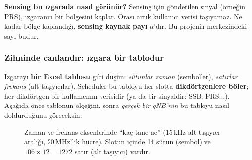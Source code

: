 \textbf{Sensing bu ızgarada nasıl görünür?} Sensing için gönderilen sinyal (örneğin PRS), ızgaranın bir bölgesini kaplar. Orası artık kullanıcı verisi taşıyamaz.
Ne kadar bölge kaplandığı, \textbf{sensing kaynak payı} $\alpha$'dır. Bu projenin merkezindeki sayı budur.

\subsubsection{Zihninde canlandır: ızgara bir tablodur}\label{sec:somut}

Izgarayı \textbf{bir Excel tablosu} gibi düşün: \emph{sütunlar zaman} (semboller), \emph{satırlar frekans} (alt taşıyıcılar). Scheduler bu tabloyu her slotta
\textbf{dikdörtgenlere böler}; her dikdörtgen bir kullanıcının verisidir (ya da bir sinyaldir: SSB, PRS...). Aşağıda önce tablonun ölçeğini, sonra \emph{gerçek bir gNB'nin} bu tabloyu nasıl doldurduğunu göreceksin.

\begin{figure}[H]
\centering
{}
\caption{Zaman ve frekans eksenlerinde ``kaç tane ne'' (15\,kHz alt taşıyıcı aralığı, 20\,MHz'lik hücre). Slotun içinde 14 sütun (sembol) ve $106\times12=1272$ satır (alt taşıyıcı) vardır.}
\end{figure}

